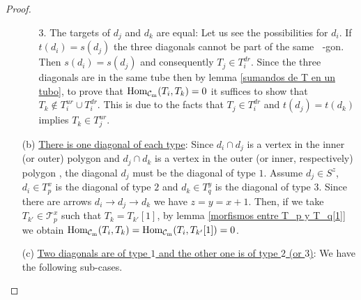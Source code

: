 \documentclass{amsart}
\theoremstyle{plain}
\theoremstyle{definition}
\begin{document}
\begin{proof}
\begin{itemize}
\begin{itemize}
  \item [3.] The targets of  $d_j$ and $d_k$ are equal: Let  us see  the possibilities for  $d_i$. If  $t(d_i)=s(d_j)$ the three diagonals  cannot be part of the same  ${\mathop{(m+2)}\nolimits}$-gon. Then $s(d_i)=s(d_j)$ and consequently $T_j\in T_i^{dr}$. Since the three diagonals are in the same  tube then by lemma \ref{sumandos de T en un tubo}, to prove that ${\mathop{\rm Hom_{\mathcal{C}_m}}\nolimits}(T_i,T_k)=0$  it suffices to show that $T_k\notin T_i^{ur}\cup T_i^{dr}$. This is due to the facts that $T_j\in T_i^{dr}$ and   $t(d_j)=t(d_k)$ implies  $T_k\in T_j^{ur}$.\\

\end{itemize}

  \item [(b)] \underline{There is one  diagonal of each type}:  Since $d_i\cap d_j$ is a vertex in the inner (or outer) polygon   and  $d_j\cap d_k$ is a vertex in the outer (or inner, respectively) polygon , the diagonal $d_j$ must be the diagonal of type $1$. Assume $d_j\in S^z$, $d_i\in T^x_p$ is the   diagonal of type $2$ and $d_k \in T^y_q$ is the  diagonal of type $3$. Since there are arrows $d_i\rightarrow d_j \rightarrow d_k$ we have $z=y=x+1$. Then, if we take  $T_{k'}\in \mathcal{T}^x_p$ such that $T_k=T_{k'}[1]$, by lemma \ref{morfismos entre T_p y T_q[1]} we obtain  ${\mathop{\rm Hom_{\mathcal{C}_m}}\nolimits}(T_i,T_k)={\mathop{\rm Hom_{\mathcal{C}_m}}\nolimits}(T_i,T_{k'}[1])=0$.\\

  \item [(c)] \underline{Two diagonals are of type $1$ and the other one is of   type $2$ (or $3$)}: We have the following sub-cases.\\


\end{itemize}
\end{proof}
\end{document}
